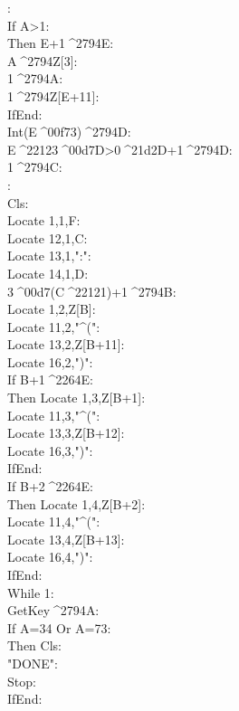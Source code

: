 \documentclass[11pt,letterpaper]{article}
\newcommand{\STO}{{\large ^^^^2794}}
\newcommand{\CBR}{{\Large ^^^^21d2}}
\newcommand{\LEQ}{^^^^2264}
\newcommand{\MUL}{^^^^00d7}
\newcommand{\DIV}{^^^^00f7}
\newcommand{\MINUS}{^^^^2212}
\newcommand{\IDENT}[1]{\hspace*{#1\BaseIndent}}
\begin{document}
\begin{multicols}{2}
\begin{linenumbers}
:\\
If A>1:\\
\IDENT{1}Then E+1\STO E:\\
\IDENT{1}A\STO Z[3]:\\
\IDENT{1}1\STO A:\\
\IDENT{1}1\STO Z[E+11]:\\
IfEnd:\\
Int(E\DIV 3)\STO D:\\
E\MINUS 3\MUL D>0\CBR D+1\STO D:\\
1\STO C:\\
:\\
Cls:\\
Locate 1,1,F:\\
Locate 12,1,C:\\
Locate 13,1,":":\\
Locate 14,1,D:\\
3\MUL(C\MINUS 1)+1\STO B:\\
Locate 1,2,Z[B]:\\
Locate 11,2,"\textasciicircum (":\\
Locate 13,2,Z[B+11]:\\
Locate 16,2,")":\\
If B+1\LEQ E:\\
\IDENT{1}Then Locate 1,3,Z[B+1]:\\
\IDENT{1}Locate 11,3,"\textasciicircum (":\\
\IDENT{1}Locate 13,3,Z[B+12]:\\
\IDENT{1}Locate 16,3,")":\\
IfEnd:\\
If B+2\LEQ E:\\
\IDENT{1}Then Locate 1,4,Z[B+2]:\\
\IDENT{1}Locate 11,4,"\textasciicircum (":\\
\IDENT{1}Locate 13,4,Z[B+13]:\\
\IDENT{1}Locate 16,4,")":\\
IfEnd:\\
While 1:\\
\IDENT{1}GetKey\STO A:\\
\IDENT{1}If A=34 Or A=73:\\
\IDENT{2}Then Cls:\\
\IDENT{2}"DONE":\\
\IDENT{2}Stop:\\
\IDENT{1}IfEnd:\\

\end{linenumbers}
\end{multicols}
\end{document}
